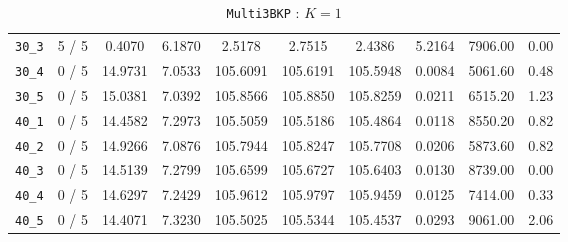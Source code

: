 \begin{table}[h!]
\begin{center}
\begin{tabular}{| c | c | c | c | c | c | c | c | c | c |}
\verb|30_3| & 5 / 5 & 0.4070 & 6.1870 & 2.5178 & 2.7515 & 2.4386 & 5.2164 & 7906.00 & 0.00\\ 
\verb|30_4| & 0 / 5 & 14.9731 & 7.0533 & 105.6091 & 105.6191 & 105.5948 & 0.0084 & 5061.60 & 0.48\\ 
\verb|30_5| & 0 / 5 & 15.0381 & 7.0392 & 105.8566 & 105.8850 & 105.8259 & 0.0211 & 6515.20 & 1.23\\ 
\verb|40_1| & 0 / 5 & 14.4582 & 7.2973 & 105.5059 & 105.5186 & 105.4864 & 0.0118 & 8550.20 & 0.82\\ 
\verb|40_2| & 0 / 5 & 14.9266 & 7.0876 & 105.7944 & 105.8247 & 105.7708 & 0.0206 & 5873.60 & 0.82\\ 
\verb|40_3| & 0 / 5 & 14.5139 & 7.2799 & 105.6599 & 105.6727 & 105.6403 & 0.0130 & 8739.00 & 0.00\\ 
\verb|40_4| & 0 / 5 & 14.6297 & 7.2429 & 105.9612 & 105.9797 & 105.9459 & 0.0125 & 7414.00 & 0.33\\ 
\verb|40_5| & 0 / 5 & 14.4071 & 7.3230 & 105.5025 & 105.5344 & 105.4537 & 0.0293 & 9061.00 & 2.06\\ 
\hline
\end{tabular}
\caption{\texttt{Multi3BKP} : $K = 1$}
\label{table:multi:1}
\end{center}
\end{table}


